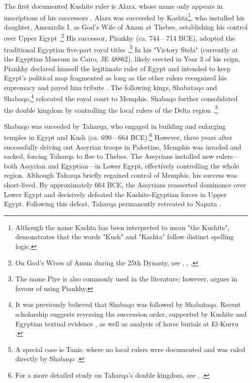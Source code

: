 The first documented Kushite ruler is Alara, whose name only appears in inscriptions of his successors \parencite[p.~110]{emberlingKushDynastyNapata2023}. Alara was succeeded by Kashta\footnote{Although the name Kashta has been interpreted to mean "the Kushite", \textcite{vinogradovDidNameKashta2003} demonstrates that the words "Kush" and "Kashta" follow distinct spelling logic.}, who installed his daughter, Amenirdis I, as God's Wife of Amun at Thebes, establishing his control over Upper Egypt \parencites[p.~319]{törökTwoWorldsFrontier2009}[p.~110]{emberlingKushDynastyNapata2023}.\footnote{On God's Wives of Amun during the 25th Dynasty, see \cite{ayadGenderRitualManipulation2016}, \cite{beckerFemaleInfluenceAside2016}, \cite{lohwasserNubianessGodsWives2016}.} 
His successor, Piankhy (ca. 744---714 BCE), adopted the traditional Egyptian five-part royal titles \parencites[p.~153]{törökKingdomKushHandbook1997}[p.~324]{törökTwoWorldsFrontier2009}.\footnote{The name Piye is also commonly used in the literature; however, \textcite{rillyNouvelleInterprétationNom2001} argues in favour of using Piankhy.} 
In his "Victory Stela" (currently at the Egyptian Museum in Cairo, JE 48862), likely erected in Year 3 of his reign, Piankhy declared himself the legitimate ruler of Egypt and intended to keep Egypt's political map fragmented as long as the other rulers recognized his supremacy and payed him tribute \parencite[p.~155]{törökKingdomKushHandbook1997}. The following kings, Shabataqo and Shabaqo,\footnote{It was previously believed that Shabaqo was followed by Shabataqo. Recent scholarship suggests reversing the succession order, supported by Kushite and Egyptian textual evidence \parencites[p.~4-9]{payraudeauRetourSuccessionShabaqoShabataqo2014}{jurmanOrderKushiteKings2017}, as well as analysis of horse burials at El-Kurru \parencite{näserKingsHorsesTwo2020}.} relocated the royal court to Memphis. Shabaqo further consolidated the double kingdom by controlling the local rulers of the Delta region \parencites[p.~166-167]{törökKingdomKushHandbook1997}[p.~141]{rillyHistoireSoudanOrigines2017}.\footnote{A special case is Tanis, where no local rulers were documented and was ruled directly by Shabaqo \parencite{mojeHerrschaftsräumeUndHerrschaftswissen2013}.}


Shabaqo was suceeded by Taharqa, who engaged in building and enlarging temples in Egypt and Kush (ca. 690---664 BCE).\footnote{For a more detailed study on Taharqa's double kingdom, see \cite{dalliborTaharqoPharaoAus2005}, \cite{popeDoubleKingdomTaharqo2014}.} However, three years after successfully driving out Assyrian troops in Palestine, Memphis was invaded and sacked, forcing Taharqa to flee to Thebes. The Assyrians installed new rulers---both Assyrian and Egyptian---in Lower Egypt, effectively controlling the whole region. Although Taharqa briefly regained control of Memphis, his success was short-lived. By approximately 664 BCE, the Assyrians reasserted dominance over Lower Egypt and decisively defeated the Kushite-Egyptian forces in Upper Egypt. Following this defeat, Taharqa permanently retreated to Napata \parencite[p.~145-154]{rillyHistoireSoudanOrigines2017}.


